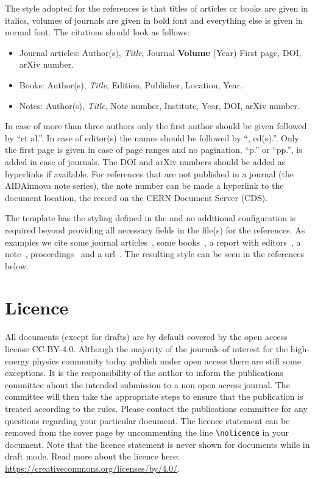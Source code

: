 The style adopted for the references is that titles of articles or books are given in italics, volumes of journals are given in bold font and everything else is given in normal font. The citations should look as follows:
\begin{itemize}
  \item Journal articles: Author(s), \textit{Title}, Journal \textbf{Volume} (Year) First page, DOI, arXiv number.
  \item Books: Author(s), \textit{Title}, Edition, Publisher, Location, Year.
  \item Notes: Author(s), \textit{Title}, Note number, Institute, Year, DOI, arXiv number.
\end{itemize}
In case of more than three authors only the first author should be given followed by ``et al.''. In case of editor(s) the names should be followed by ``, ed(s).''. Only the first page is given in case of page ranges and no pagination, \ie ``p.'' or ``pp.'', is added in case of journals. The DOI and arXiv numbers should be added as hyperlinks if available. For references that are not published in a journal (\eg the AIDAinnova note series), the note number can be made a hyperlink to the document location, \ie the record on the CERN Document Server (CDS).

The \latex template has the styling defined in the  and no additional configuration is required beyond providing all necessary fields in the  file(s) for the references. As examples we cite some journal articles~\cite{Higgs:1964pj,Aad:2012tfa,Chatrchyan:2012ufa}, some books~\cite{Griffiths:111880,Gunion:322177}, a report with editors~\cite{cdrvol2}, a note~\cite{Redford:1690648}, proceedings~\cite{Schulte:2001aw} and a url~\cite{lcio}. The resulting style can be seen in the references below.

\section{Licence}
\label{sec:licence}
All documents (except for drafts) are by default covered by the open access license CC-BY-4.0. Although the majority of the journals of interest for the high-energy physics community today publish under open access there are still some exceptions. It is the responsibility of the author to inform the publications committee about the intended submission to a non open access journal. The committee will then take the appropriate steps to ensure that the publication is treated according to the rules. Please contact the publications committee for any questions regarding your particular document. The licence statement can be removed from the cover page by uncommenting the line \texttt{\textbackslash nolicence} in your document. Note that the licence statement is never shown for documents while in draft mode. Read more about the licence here: \href{https://creativecommons.org/licenses/by/4.0/}{https://creativecommons.org/licenses/by/4.0/}.



